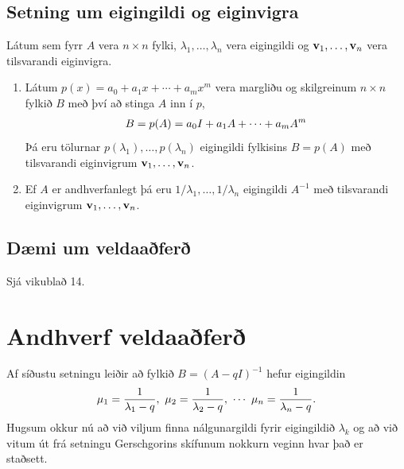 \documentclass[letterpaper,10pt,icelandic]{sphinxmanual}
\begin{document}
\subsection{Setning um eigingildi og eiginvigra}
\label{kafli09:setning-um-eigingildi-og-eiginvigra}
Látum sem fyrr \(A\) vera \(n\times n\) fylki,
\(\lambda_1,\dots,\lambda_n\) vera eigingildi og
\({\mbox{${\bf v}$}}_1,\dots,{\mbox{${\bf v}$}}_n\) vera tilsvarandi
eiginvigra.
\begin{enumerate}
\item {} 
Látum \(p(x)=a_0+a_1x+\cdots+a_mx^m\) vera margliðu og
skilgreinum \(n\times n\) fylkið \(B\) með því að stinga
\(A\) inn í \(p\),
\begin{gather}
\begin{split}B=p(A)=a_0I+a_1A+\cdots+a_mA^m\end{split}\notag
\end{gather}
Þá eru tölurnar \(p(\lambda_1),\dots,p(\lambda_n)\) eigingildi
fylkisins \(B=p(A)\) með tilsvarandi eiginvigrum
\({\mbox{${\bf v}$}}_1,\dots,{\mbox{${\bf v}$}}_n\).

\item {} 
Ef \(A\) er andhverfanlegt þá eru
\(1/\lambda_1,\dots,1/\lambda_n\) eigingildi \(A^{-1}\) með
tilsvarandi eiginvigrum
\({\mbox{${\bf v}$}}_1,\dots,{\mbox{${\bf v}$}}_n\).

\end{enumerate}


\subsection{Dæmi um veldaaðferð}
\label{kafli09:daemi-um-veldaafer}
Sjá vikublað 14.


\section{Andhverf veldaaðferð}
\label{kafli09:index-7}\label{kafli09:andhverf-veldaafer}
Af síðustu setningu leiðir að fylkið \(B=(A-qI)^{-1}\) hefur
eigingildin
\begin{gather}
\begin{split}\mu_1=\dfrac 1{\lambda_1-q},\
\mu_2=\dfrac 1{\lambda_2-q},\ \cdots \
\mu_n=\dfrac 1{\lambda_n-q}.\end{split}\notag
\end{gather}
Hugsum okkur nú að við viljum finna nálgunargildi fyrir eigingildið
\(\lambda_k\) og að við vitum út frá setningu Gerschgorins skífunum
nokkurn veginn hvar það er staðsett.
\end{document}
